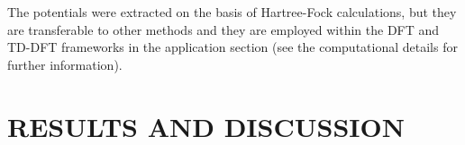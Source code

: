 \documentclass[12pt]{article}
\begin{document}
The potentials were extracted on the basis of Hartree-Fock calculations, but they are transferable
to other methods and they are employed within the DFT and TD-DFT frameworks in the application section (see the
computational details for further information).

\section*{\sffamily \Large RESULTS AND DISCUSSION}



%
%

%
\end{document}

